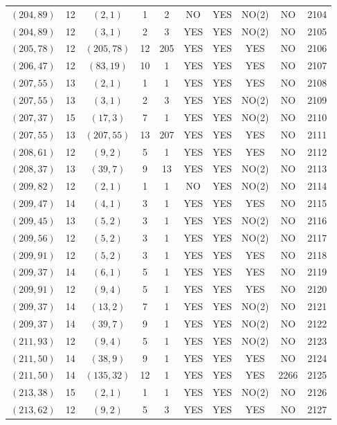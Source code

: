 \begin{longtable}{|c|c|c|c|c|c|c|c|c|c|}
$(204, 89)$ & 12 & $(2, 1)$ & 1 & 2 & NO & YES & NO(2) & NO & 2104\\
$(204, 89)$ & 12 & $(3, 1)$ & 2 & 3 & YES & YES & NO(2) & NO & 2105\\
$(205, 78)$ & 12 & $(205, 78)$ & 12 & 205 & YES & YES & YES & NO & 2106\\
$(206, 47)$ & 12 & $(83, 19)$ & 10 & 1 & YES & YES & YES & NO & 2107\\
$(207, 55)$ & 13 & $(2, 1)$ & 1 & 1 & YES & YES & YES & NO & 2108\\
$(207, 55)$ & 13 & $(3, 1)$ & 2 & 3 & YES & YES & NO(2) & NO & 2109\\
$(207, 37)$ & 15 & $(17, 3)$ & 7 & 1 & YES & YES & NO(2) & NO & 2110\\
$(207, 55)$ & 13 & $(207, 55)$ & 13 & 207 & YES & YES & YES & NO & 2111\\
$(208, 61)$ & 12 & $(9, 2)$ & 5 & 1 & YES & YES & YES & NO & 2112\\
$(208, 37)$ & 13 & $(39, 7)$ & 9 & 13 & YES & YES & NO(2) & NO & 2113\\
$(209, 82)$ & 12 & $(2, 1)$ & 1 & 1 & NO & YES & NO(2) & NO & 2114\\
$(209, 47)$ & 14 & $(4, 1)$ & 3 & 1 & YES & YES & YES & NO & 2115\\
$(209, 45)$ & 13 & $(5, 2)$ & 3 & 1 & YES & YES & NO(2) & NO & 2116\\
$(209, 56)$ & 12 & $(5, 2)$ & 3 & 1 & YES & YES & NO(2) & NO & 2117\\
$(209, 91)$ & 12 & $(5, 2)$ & 3 & 1 & YES & YES & YES & NO & 2118\\
$(209, 37)$ & 14 & $(6, 1)$ & 5 & 1 & YES & YES & YES & NO & 2119\\
$(209, 91)$ & 12 & $(9, 4)$ & 5 & 1 & YES & YES & YES & NO & 2120\\
$(209, 37)$ & 14 & $(13, 2)$ & 7 & 1 & YES & YES & NO(2) & NO & 2121\\
$(209, 37)$ & 14 & $(39, 7)$ & 9 & 1 & YES & YES & NO(2) & NO & 2122\\
$(211, 93)$ & 12 & $(9, 4)$ & 5 & 1 & YES & YES & NO(2) & NO & 2123\\
$(211, 50)$ & 14 & $(38, 9)$ & 9 & 1 & YES & YES & YES & NO & 2124\\
$(211, 50)$ & 14 & $(135, 32)$ & 12 & 1 & YES & YES & YES & 2266 & 2125\\
$(213, 38)$ & 15 & $(2, 1)$ & 1 & 1 & YES & YES & NO(2) & NO & 2126\\
$(213, 62)$ & 12 & $(9, 2)$ & 5 & 3 & YES & YES & YES & NO & 2127\\

\end{longtable}
